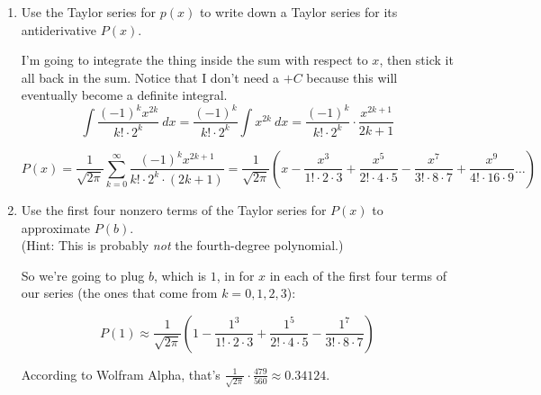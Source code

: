 \documentclass[10pt]{article}
\newenvironment{red}{\color{red}}{\ignorespacesafterend}
\begin{document}
\begin{enumerate}[leftmargin=0pt]
    \begin{red}
    We are going to substitute $-\frac{x^2}{2}$ for all the $u$'s in the previous result, then multiply by $\frac{1}{\sqrt{2\pi}}$:
    \[p(x) = \frac{1}{\sqrt{2\pi}} \exp\left(\frac{-x^2}{2}\right) = \frac{1}{\sqrt{2\pi}} \sum_{k=0}^\infty \frac{1}{k!} \left(\frac{-x^2}{2}\right)^k = \frac{1}{\sqrt{2\pi}}\cdot \left(1 + \frac{(-x^2 / 2)}{1!} + \frac{(-x^2 / 2)^2}{2!} + \frac{(-x^2/2)^3}{3!} + \ldots \right)\]
    Simplifying a little:
    \[ p(x) = \frac{1}{\sqrt{2\pi}} \sum_{k=0}^\infty \frac{(-1)^k x^{2k}}{k!\cdot 2^k} = \frac{1}{\sqrt{2\pi}} \left(1 - \frac{x^2}{1! \cdot 2} + \frac{x^4}{2!\cdot 4} - \frac{x^6}{3!\cdot 8} + \frac{x^8}{4! \cdot 16} \ldots \right) \]
    \end{red}
    \item Use the Taylor series for $p(x)$ to write down a Taylor series for its antiderivative $P(x)$.
    
    \begin{red}
    I'm going to integrate the thing inside the sum with respect to $x$, then stick it all back in the sum. Notice that I don't need a $+C$ because this will eventually become a definite integral.
    \[\int \frac{(-1)^k x^{2k}}{k!\cdot 2^k}\ dx
    = \frac{(-1)^k }{k!\cdot 2^k} \int x^{2k} \ dx 
    = \frac{(-1)^k }{k!\cdot 2^k} \cdot \frac{x^{2k+1}}{2k+1}
    \]
    
    \[P(x) = \frac{1}{\sqrt{2\pi}} \sum_{k=0}^\infty \frac{(-1)^k x^{2k+1} }{k!\cdot 2^k \cdot (2k+1)} = \frac{1}{\sqrt{2\pi}} \left(x - \frac{x^3}{1! \cdot 2\cdot 3} + \frac{x^5}{2!\cdot 4\cdot 5} - \frac{x^7}{3!\cdot 8 \cdot 7} + \frac{x^9}{4! \cdot 16\cdot 9} \ldots \right)\]
    \end{red}
    \item Use the first four nonzero terms of the Taylor series for $P(x)$ to approximate $P(b)$. \\
    (Hint: This is probably \textit{not} the fourth-degree polynomial.)
    
    \begin{red}
    So we're going to plug $b$, which is $1$, in for $x$ in each of the first four terms of our series (the ones that come from $k=0, 1, 2, 3$):
    
    \[P(1) \approx \frac{1}{\sqrt{2\pi}} \left(1 - \frac{1^3}{1! \cdot 2\cdot 3} + \frac{1^5}{2!\cdot 4\cdot 5} - \frac{1^7}{3!\cdot 8 \cdot 7}\right)\]
    
    According to Wolfram Alpha, that's $\frac{1}{\sqrt{2\pi}}\cdot  \frac{479}{560} \approx 0.34124$.
    

\end{red}
\end{enumerate}
\end{document}
